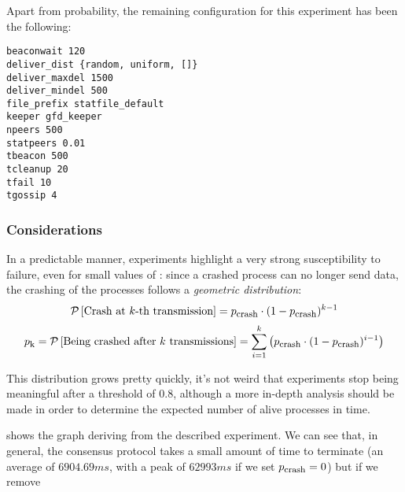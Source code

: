 Apart from probability, the remaining configuration for this experiment
has been the following:
\begin{verbatim}
beaconwait 120
deliver_dist {random, uniform, []}
deliver_maxdel 1500
deliver_mindel 500
file_prefix statfile_default
keeper gfd_keeper
npeers 500
statpeers 0.01
tbeacon 500
tcleanup 20
tfail 10
tgossip 4
\end{verbatim}

\subsubsection{Considerations} \label{subsub:ManyRuns}

In a predictable manner, experiments highlight a very strong
susceptibility to failure, even for small values of \PCrash:
since a crashed process can no longer send data, the crashing of the
processes follows a \emph{geometric distribution}:
\[
\mathcal{P}\left[{\mbox{Crash at $k$-th transmission}}\right] =
    {p}_{\mbox{\footnotesize{crash}}} \cdot (1 - {p}_{\mbox{\footnotesize{crash}}})^{k - 1}
\]\[
{p}_{\mbox{\footnotesize{k}}} =
\mathcal{P}\left[{\mbox{Being crashed after $k$ transmissions}}\right] =
    \sum_{i = 1}^{k}\left( {p}_{\mbox{\footnotesize{crash}}} \cdot (1 - {p}_{\mbox{\footnotesize{crash}}})^{i - 1} \right)
\]

This distribution grows pretty quickly, it's not weird that experiments
stop being meaningful after a threshold of 0.8, although a more in-depth
analysis should be made in order to determine the expected number of alive
processes in time.


 shows the graph deriving from the described experiment.
We can see that, in general, the consensus protocol takes a small amount of
time to terminate (an average of $6904.69 ms$, with a peak of $62993 ms$ if
we set ${p}_{\mbox{\footnotesize{crash}}} = 0$) but if we remove 


